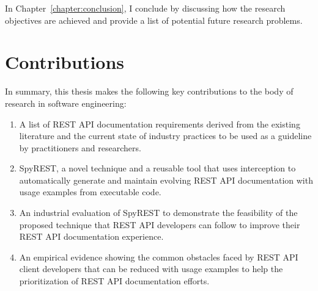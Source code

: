 In Chapter~\ref{chapter:conclusion}, I conclude by discussing how the research objectives are achieved and provide a list of potential future research problems.

\section{Contributions}
In summary, this thesis makes the following key contributions to the body of research in software engineering:


\begin{enumerate}
  \item A list of REST API documentation requirements derived from the existing literature and the current state of industry practices to be used as a guideline by practitioners and researchers.
  \item SpyREST, a novel technique and a reusable tool that uses interception to automatically generate and maintain evolving REST API documentation with usage examples from executable code.
  \item An industrial evaluation of SpyREST to demonstrate the feasibility of the proposed technique that REST API developers can follow to improve their REST API documentation experience.
  \item An empirical evidence showing the common obstacles faced by REST API client developers that can be reduced with usage examples to help the prioritization of REST API documentation efforts.
\end{enumerate}

\newpage




